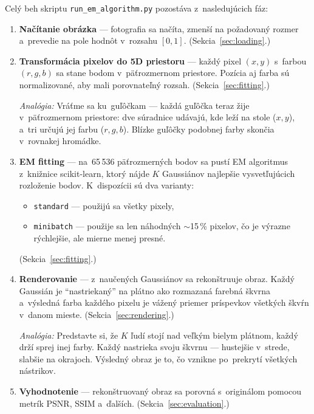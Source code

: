 \documentclass[a4paper,11pt]{article}
\begin{document}
Celý beh skriptu \texttt{run\_em\_algorithm.py} pozostáva
z~nasledujúcich fáz:

\begin{enumerate}
  \item \textbf{Načítanie obrázka} --- fotografia sa načíta, zmenší na
        požadovaný rozmer a~prevedie na pole hodnôt v~rozsahu $[0, 1]$.
        (Sekcia~\ref{sec:loading}.)

  \item \textbf{Transformácia pixelov do 5D priestoru} --- každý pixel
        $(x, y)$ s~farbou $(r, g, b)$ sa stane bodom v~päťrozmernom priestore.
        Pozícia aj farba sú normalizované, aby mali porovnateľný rozsah.
        (Sekcia~\ref{sec:fitting}.)

        \emph{Analógia:} Vráťme sa ku~guľôčkam --- každá guľôčka teraz
        žije v~päťrozmernom priestore: dve súradnice udávajú, kde leží
        na stole ($x, y$), a~tri určujú jej farbu ($r, g, b$).
        Blízke guľôčky podobnej farby skončia v~rovnakej hromádke.

  \item \textbf{EM fitting} --- na~65\,536 päťrozmerných bodov sa pustí
        EM algoritmus z~knižnice scikit-learn, ktorý nájde $K$ Gaussiánov
        najlepšie vysvetľujúcich rozloženie bodov.  K~dispozícii sú dva
        varianty:
        \begin{itemize}[nosep]
          \item \texttt{standard} --- použijú sa všetky pixely,
          \item \texttt{minibatch} --- použije sa len náhodných $\sim$15\,\%
                pixelov, čo je výrazne rýchlejšie, ale mierne menej presné.
        \end{itemize}
        (Sekcia~\ref{sec:fitting}.)

  \item \textbf{Renderovanie} --- z~naučených Gaussiánov sa rekonštruuje
        obraz.  Každý Gaussián je ``nastriekaný'' na plátno ako rozmazaná
        farebná škvrna a~výsledná farba každého pixelu je vážený priemer
        príspevkov všetkých škvŕn v~danom mieste.
        (Sekcia~\ref{sec:rendering}.)

        \emph{Analógia:} Predstavte si, že $K$ ľudí stojí nad veľkým
        bielym plátnom, každý drží sprej inej farby.  Každý nastrieka
        svoju škvrnu --- hustejšie v~strede, slabšie na okrajoch.  Výsledný
        obraz je to, čo vznikne po~prekrytí všetkých nástrikov.

  \item \textbf{Vyhodnotenie} --- rekonštruovaný obraz sa porovná
        s~originálom pomocou metrík PSNR, SSIM a~ďalších.
        (Sekcia~\ref{sec:evaluation}.)
\end{enumerate}
\end{document}
